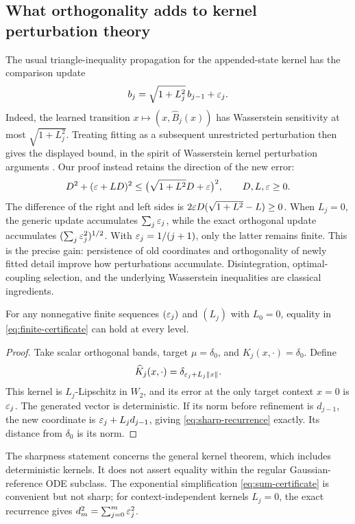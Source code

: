 \subsection{What orthogonality adds to kernel perturbation theory}\label{sec:comparison}
The usual triangle-inequality propagation for the appended-state kernel has the comparison update
\[
 b_j=\sqrt{1+L_j^2}\,b_{j-1}+\varepsilon_j.
\]
Indeed, the learned transition $x\mapsto(x,\widehat B_j(x))$ has Wasserstein sensitivity at most $\sqrt{1+L_j^2}$. Treating fitting as a subsequent unrestricted perturbation then gives the displayed bound, in the spirit of Wasserstein kernel perturbation arguments \citep{rudolf2018}. Our proof instead retains the direction of the new error:
\begin{equation}\label{eq:orthogonal-improvement}
 D^2+(\varepsilon+LD)^2\le
 \bigl(\sqrt{1+L^2}D+\varepsilon\bigr)^2,
 \qquad D,L,\varepsilon\ge0.
\end{equation}
The difference of the right and left sides is
$2\varepsilon D(\sqrt{1+L^2}-L)\ge0$.
When $L_j=0$, the generic update accumulates $\sum_j\varepsilon_j$, while the exact orthogonal update accumulates $(\sum_j\varepsilon_j^2)^{1/2}$. With $\varepsilon_j=1/(j+1)$, only the latter remains finite. This is the precise gain: persistence of old coordinates and orthogonality of newly fitted detail improve how perturbations accumulate. Disintegration, optimal-coupling selection, and the underlying Wasserstein inequalities are classical ingredients.

\begin{proposition}\label{prop:sharpness}
For any nonnegative finite sequences $(\varepsilon_j)$ and $(L_j)$ with $L_0=0$, equality in \eqref{eq:finite-certificate} can hold at every level.
\end{proposition}
\begin{proof}
Take scalar orthogonal bands, target $\mu=\delta_0$, and $K_j(x,\cdot)=\delta_0$. Define
\[
 \widehat K_j(x,\cdot)=\delta_{\varepsilon_j+L_j\left\lVert x\right\rVert}.
\]
This kernel is $L_j$-Lipschitz in $W_2$, and its error at the only target context $x=0$ is $\varepsilon_j$. The generated vector is deterministic. If its norm before refinement is $d_{j-1}$, the new coordinate is $\varepsilon_j+L_jd_{j-1}$, giving \eqref{eq:sharp-recurrence} exactly. Its distance from $\delta_0$ is its norm.
\end{proof}

The sharpness statement concerns the general kernel theorem, which includes deterministic kernels. It does not assert equality within the regular Gaussian-reference ODE subclass. The exponential simplification \eqref{eq:sum-certificate} is convenient but not sharp; for context-independent kernels $L_j=0$, the exact recurrence gives $d_m^2=\sum_{j=0}^m\varepsilon_j^2$.

